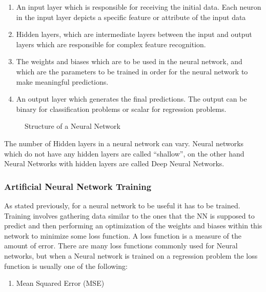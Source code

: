 \begin{enumerate}
\def\labelenumi{\arabic{enumi}.}
\item
  An input layer which is responsible for receiving the initial data.
  Each neuron in the input layer depicts a specific feature or attribute
  of the input data
\item
  Hidden layers, which are intermediate layers between the input and
  output layers which are responsible for complex feature recognition.
\item
  The weights and biases which are to be used in the neural network, and
  which are the parameters to be trained in order for the neural network
  to make meaningful predictions.
\item
  An output layer which generates the final predictions. The output can
  be binary for classification problems or scalar for regression
  problems.
\end{enumerate}

\begin{figure}[H]
    \centering
    
    \caption{Structure of a Neural Network \cite{takyar2025}}

\end{figure}

The number of Hidden layers in a neural network can vary. Neural
networks which do not have any hidden layers are called ``shallow'', on
the other hand Neural Networks with hidden layers are called Deep Neural
Networks.

\subsubsection{Artificial Neural Network Training}

As stated previously, for a neural network to be useful it has to be trained. Training involves gathering data similar to the ones that the NN is supposed to predict and then performing an optimization of the weights and biases within this network to minimize some loss function. A loss function is a measure of the amount of error. There are many loss functions commonly used for Neural networks, but when a Neural network
is trained on a regression problem the loss function is usually one of the following:

\begin{enumerate}
\def\labelenumi{\arabic{enumi}.}
\item
  Mean Squared Error (MSE)
\end{enumerate}

